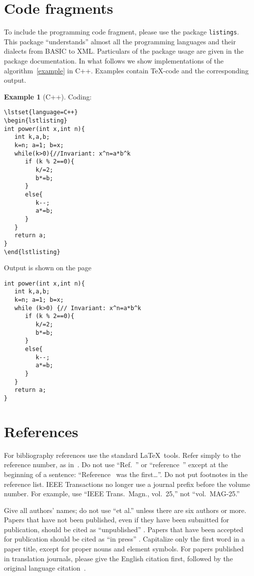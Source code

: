 \documentclass[conference]{IEEEtran}
\theoremstyle{definition}
\newtheorem{example}[remark]{Example}
\begin{document}
\section{Code fragments}
To include the programming code fragment, please use the package \verb|listings|. This package ``understands'' almost all the programming languages and their dialects from BASIC to XML. Particulars of the package usage are given in the package documentation. In what follows we show implementations of the algorithm~\ref{example} in C++. Examples contain \TeX-code and the corresponding output.

\begin{example}[C++]
Coding:
\begin{verbatim}
\lstset{language=C++}
\begin{lstlisting}
int power(int x,int n){
   int k,a,b;
   k=n; a=1; b=x;
   while(k>0){//Invariant: x^n=a*b^k
      if (k % 2==0){
         k/=2;
         b*=b;
      }
      else{
         k--;
         a*=b;
      }
   }
   return a;
}
\end{lstlisting}
\end{verbatim}
Output is shown on the page~\pageref{c++}
\begin{algorithm}[tbp]
\caption{Calculating $x$ to the 
power~$n$ in C++\label{c++}}
\lstset{language=C++}
\begin{lstlisting}
int power(int x,int n){
   int k,a,b;
   k=n; a=1; b=x;
   while (k>0) {// Invariant: x^n=a*b^k
      if (k % 2==0){
         k/=2;
         b*=b;
      }
      else{
         k--;
         a*=b;
      }
   }
   return a;
}
\end{lstlisting}
\end{algorithm}
\end{example}



\section{References}
For bibliography references use the standard \LaTeX\ tools. Refer simply to the reference number, as in~\cite{c3}. Do not use ``Ref.~\cite{c3}'' or ``reference~\cite{c3}'' except at the beginning of a sentence:  ``Reference~\cite{c3} was the first\dots''. Do not put footnotes in the reference list. IEEE Transactions no longer use a journal prefix before the volume number.  For example, use ``IEEE Trans.\ Magn., vol.~25,'' not ``vol.~MAG-25.''

Give all authors' names; do not use ``et al.'' unless there are six authors or more.  Papers that have not been published, even if they have been submitted for publication, should be cited as ``unpublished'' \cite{cu}.  Papers that have been accepted for publication should be cited as ``in press'' \cite{cin}.  Capitalize only the first word in a paper title, except for proper nouns and element symbols.
For papers published in translation journals, please give the English citation first, followed by the original language citation~\cite{ctr}.
\end{document}
